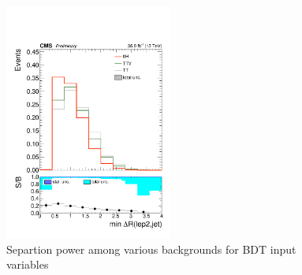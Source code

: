 \begin{figure}[htp]
\includegraphics[width=0.49\textwidth]{ch9_figs/kinMVA_input_mindr_lep2_jet.pdf}
\caption[Signal extraction BDT input variables]{Separtion power among various backgrounds for BDT input variables}
\label{fig:inputs1}
\end{figure}

